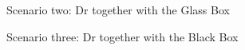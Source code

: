 \documentclass[manuscript,screen,review]{acmart}
\begin{document}
\begin{figure}[H]
    \caption{Scenario two: Dr together with the Glass Box}
    \label{fig:questionnaire-scenario-2}
\end{figure}
\begin{figure}[H]
    \caption{Scenario three: Dr together with the Black Box}
    \label{fig:questionnaire-scenario-3}
\end{figure}
\end{document}

